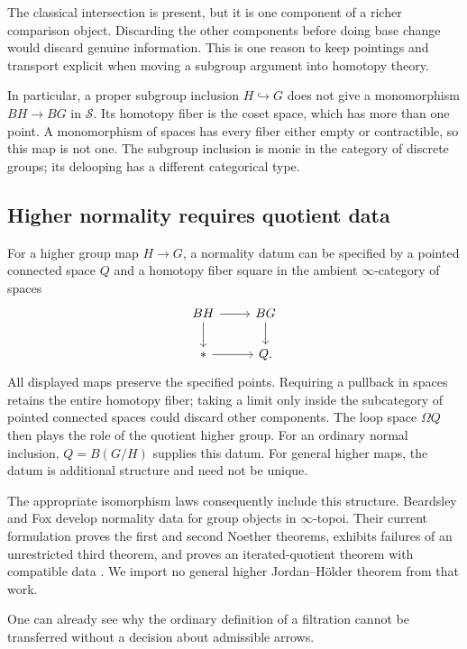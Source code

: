 \documentclass[11pt]{article}
\theoremstyle{definition}
\theoremstyle{remark}\newtheorem{remark}[theorem]{Remark}
\begin{document}
The classical intersection is present, but it is one component of a richer
comparison object.  Discarding the other components before doing base
change would discard genuine information.  This is one reason to keep
pointings and transport explicit when moving a subgroup argument into
homotopy theory.

In particular, a proper subgroup inclusion $H\hookrightarrow G$ does not
give a monomorphism $BH\to BG$ in $\mathcal S$.  Its homotopy fiber is the
coset space, which has more than one point.  A monomorphism of spaces has
every fiber either empty or contractible, so this map is not one.
The subgroup inclusion is monic in the category of discrete groups;
its delooping has a different categorical type.

\subsection{Higher normality requires quotient data}

For a higher group map $H\to G$, a normality datum can be specified by a
pointed connected space $Q$ and a homotopy fiber square in the ambient
$\infty$-category of spaces
\[
\begin{tikzcd}
 BH \arrow[r] \arrow[d] & BG \arrow[d]\\
 * \arrow[r] & Q.
\end{tikzcd}
\]
All displayed maps preserve the specified points. Requiring a pullback
in spaces retains the entire homotopy fiber; taking a limit only inside
the subcategory of pointed connected spaces could discard other components.
The loop space $\Omega Q$ then plays the role of the quotient higher
group.  For an ordinary normal inclusion, $Q=B(G/H)$ supplies this datum.
For general higher maps, the datum is additional structure and need not
be unique.

The appropriate isomorphism laws consequently include this structure.
Beardsley and Fox develop normality data for group objects in
$\infty$-topoi.  Their current formulation proves the first and second
Noether theorems, exhibits failures of an unrestricted third theorem,
and proves an iterated-quotient theorem with compatible data
\cite[\S5, especially Theorem 5.14]{BeardsleyFox}.  We import no general
higher Jordan--H\"older theorem from that work.

One can already see why the ordinary definition of a filtration cannot
be transferred without a decision about admissible arrows.
\end{document}
